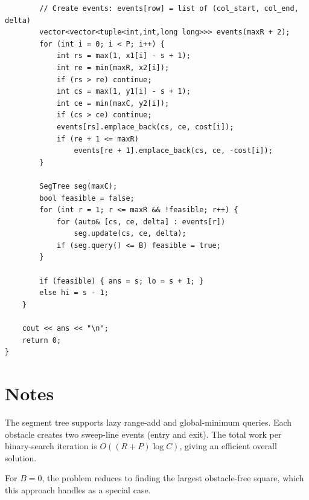 \documentclass[11pt,a4paper]{article}
\begin{document}
\begin{lstlisting}
        // Create events: events[row] = list of (col_start, col_end, delta)
        vector<vector<tuple<int,int,long long>>> events(maxR + 2);
        for (int i = 0; i < P; i++) {
            int rs = max(1, x1[i] - s + 1);
            int re = min(maxR, x2[i]);
            if (rs > re) continue;
            int cs = max(1, y1[i] - s + 1);
            int ce = min(maxC, y2[i]);
            if (cs > ce) continue;
            events[rs].emplace_back(cs, ce, cost[i]);
            if (re + 1 <= maxR)
                events[re + 1].emplace_back(cs, ce, -cost[i]);
        }

        SegTree seg(maxC);
        bool feasible = false;
        for (int r = 1; r <= maxR && !feasible; r++) {
            for (auto& [cs, ce, delta] : events[r])
                seg.update(cs, ce, delta);
            if (seg.query() <= B) feasible = true;
        }

        if (feasible) { ans = s; lo = s + 1; }
        else hi = s - 1;
    }

    cout << ans << "\n";
    return 0;
}
\end{lstlisting}

\section{Notes}
The segment tree supports lazy range-add and global-minimum queries. Each obstacle creates two sweep-line events (entry and exit). The total work per binary-search iteration is $O((R + P) \log C)$, giving an efficient overall solution.

For $B = 0$, the problem reduces to finding the largest obstacle-free square, which this approach handles as a special case.
\end{document}
